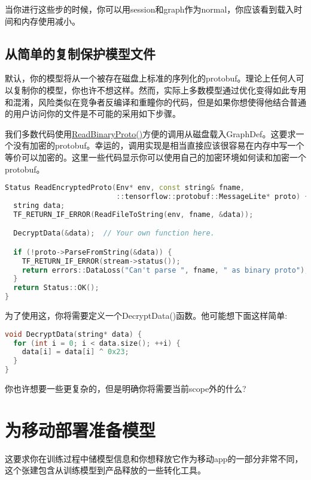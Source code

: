 当你进行这些步的时候，你可以用session和graph作为normal，你应该看到载入时间和内存使用减小。

\subsection{从简单的复制保护模型文件}
默认，你的模型将从一个被存在磁盘上标准的序列化的protobuf。理论上任何人可以复制你的模型，你也许不想这样。然而，实际上多数模型通过优化变得如此专用和混淆，风险类似在竞争者反编译和重瞳你的代码，但是如果你想使得他结合普通的用户访问你的文件是不可能的采用如下步骤。

我们多数代码使用\href{https://www.github.com/tensorflow/tensorflow/blob/r1.4/tensorflow/core/platform/env.cc?q=core/platform/env.cc&l=409}{ReadBinaryProto()}方便的调用从磁盘载入GraphDef。这要求一个没有加密的protobuf。幸运的，调用实现是相当直接应该很容易在内存中写一个等价可以加密的。这里一些代码显示你可以使用自己的加密环境如何读和加密一个protobuf。
\begin{lstlisting}[language=C++]
Status ReadEncryptedProto(Env* env, const string& fname,
                          ::tensorflow::protobuf::MessageLite* proto) {
  string data;
  TF_RETURN_IF_ERROR(ReadFileToString(env, fname, &data));

  DecryptData(&data);  // Your own function here.

  if (!proto->ParseFromString(&data)) {
    TF_RETURN_IF_ERROR(stream->status());
    return errors::DataLoss("Can't parse ", fname, " as binary proto");
  }
  return Status::OK();
}
\end{lstlisting}
为了使用这，你将需要定义一个DecryptData()函数。他可能想下面这样简单:
\begin{lstlisting}[language=C++]
void DecryptData(string* data) {
  for (int i = 0; i < data.size(); ++i) {
    data[i] = data[i] ^ 0x23;
  }
}

\end{lstlisting}
你也许想要一些更复杂的，但是明确你将需要当前scope外的什么?
\section{为移动部署准备模型}
这要求你在训练过程中储模型信息和你想释放它作为移动app的一部分非常不同，这个张建包含从训练模型到产品释放的一些转化工具。
